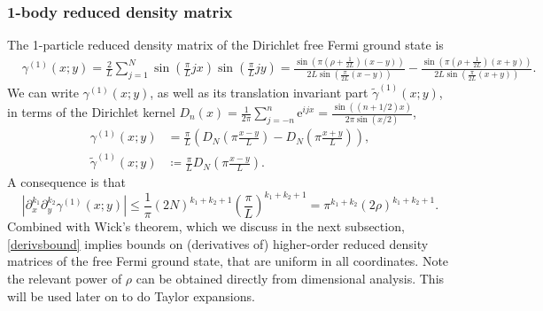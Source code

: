 \documentclass[a4paper,11pt]{article}
\newcommand{\euler}[1]{\text{e}^{#1}}
\newcommand{\abs}[1]{\left\lvert #1 \right\rvert}
\numberwithin{equation}{section}
\begin{document}
	\subsubsection{1-body reduced density matrix}
	The 1-particle reduced density matrix of the Dirichlet free Fermi ground state is
	\begin{equation}
	\begin{aligned}
	&\gamma^{(1)}(x;y)=\frac{2}{L}\sum_{j=1}^{N}\sin\left(\frac{\pi}{L}jx\right)\sin\left(\frac{\pi}{L} jy\right)=\frac{\sin\left(\pi\left(\rho+\frac{1}{2L}\right)(x-y)\right)}{2L\sin\left(\frac{\pi}{2L}(x-y)\right)}-\frac{\sin\left(\pi\left(\rho+\frac{1}{2L}\right)(x+y)\right)}{2L\sin\left(\frac{\pi}{2L}(x+y)\right)}.
	\end{aligned}
	\end{equation}
 We can write $ \gamma^{(1)}(x;y)$, as well as its translation invariant part $\tilde{\gamma}^{(1)}(x;y) $, in terms of the Dirichlet kernel $ D_n(x)=\frac{1}{2\pi}\sum_{j=-n}^{n}\euler{ijx}=\frac{\sin((n+1/2)x)}{2\pi\sin(x/2)} $, \begin{equation}
	\begin{aligned}
 \label{gamma1tildegamma1}
	\gamma^{(1)}(x;y)&=\frac{\pi}{L}\left(D_{N}\left(\pi\frac{x-y}{L}\right)-D_{N}\left(\pi\frac{x+y}{L}\right)\right),\\
	\tilde{\gamma}^{(1)}(x;y)&\coloneqq \frac{\pi}{L}D_{N}\left(\pi \frac{x-y}{L}\right).
	\end{aligned}
	\end{equation}
	A consequence is that 
 \begin{equation}
\label{derivsbound}
\abs{\partial_{x}^{k_1}\partial_{y}^{k_2}\gamma^{(1)}(x;y)}\leq \frac{1}{\pi}(2N)^{k_1+k_2+1}\left(\frac{\pi}{L}\right)^{k_1+k_2+1}=\pi^{k_1+k_2}(2\rho)^{k_1+k_2+1}.
 \end{equation}
 Combined with Wick's theorem, which we discuss in the next subsection, \eqref{derivsbound} implies bounds on (derivatives of) higher-order reduced density matrices of the free Fermi ground state, that are uniform in all coordinates. Note the relevant power of $ \rho $ can be obtained directly from dimensional analysis. This will be used later on to do Taylor expansions.\\
\end{document}
